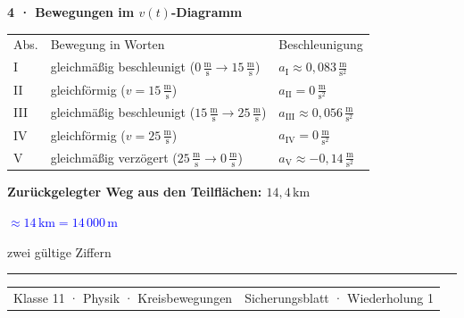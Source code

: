 \documentclass[10pt,a4paper]{article}
\newcommand{\sectiontitle}[1]{%
  \vspace{1.0mm}%
  {\color{Blue}\bfseries\large #1}\par
  \vspace{0.3mm}{\color{Blue}\rule{\linewidth}{0.7pt}}\par
  \vspace{0.4mm}%
}
\newcommand{\unit}[1]{\,\mathrm{#1}}
\newcommand{\unitfrac}[2]{\,\frac{\mathrm{#1}}{\mathrm{#2}}}
\begin{document}
\sectiontitle{4 · Bewegungen im $v(t)$-Diagramm}

\begin{minipage}[t]{0.49\linewidth}
\vspace{0pt}
\centering
{}
\end{minipage}\hfill
\begin{minipage}[t]{0.49\linewidth}
\vspace{0pt}
\begin{tabularx}{\linewidth}{@{}>{\centering\arraybackslash}p{9mm}>{\raggedright\arraybackslash}X>{\raggedleft\arraybackslash}p{34mm}@{}}
  \rowcolor{Sky}Abs. & Bewegung in Worten & Beschleunigung \\
  I & gleichmäßig beschleunigt ($0\unitfrac{m}{s}\rightarrow15\unitfrac{m}{s}$) & $a_{\mathrm{I}}\approx 0{,}083\unitfrac{m}{s^{2}}$ \\
  II & gleichförmig ($v=15\unitfrac{m}{s}$) & $a_{\mathrm{II}}=0\unitfrac{m}{s^{2}}$ \\
  III & gleichmäßig beschleunigt ($15\unitfrac{m}{s}\rightarrow25\unitfrac{m}{s}$) & $a_{\mathrm{III}}\approx 0{,}056\unitfrac{m}{s^{2}}$ \\
  IV & gleichförmig ($v=25\unitfrac{m}{s}$) & $a_{\mathrm{IV}}=0\unitfrac{m}{s^{2}}$ \\
  V & gleichmäßig verzögert ($25\unitfrac{m}{s}\rightarrow0\unitfrac{m}{s}$) & $a_{\mathrm{V}}\approx -0{,}14\unitfrac{m}{s^{2}}$
\end{tabularx}
\end{minipage}
\vspace{1.0mm}
\colorbox{Mint}{\parbox{\dimexpr\linewidth-2\fboxsep\relax}{\centering
  \vspace{1.1mm}\textbf{Zurückgelegter Weg aus den Teilflächen: $14{,}4\unit{km}$}\par
  \textcolor{Blue}{\bfseries $\approx14\unit{km}=14\,000\unit{m}$}\par
  {\scriptsize zwei gültige Ziffern}\vspace{1.1mm}}}

\vfill
{\color{Line}\rule{\linewidth}{0.5pt}}\par
\vspace{1.2mm}
\begin{tabularx}{\linewidth}{@{}Xr@{}}
  {\small\color{Muted}Klasse 11 · Physik · Kreisbewegungen} &
  {\small\color{Muted}Sicherungsblatt · Wiederholung 1}
\end{tabularx}
\end{document}
